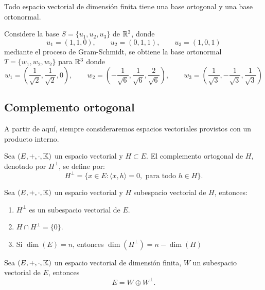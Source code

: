 \documentclass[a4,11pt]{aleph-notas}
\begin{document}
\begin{teo}
    Todo espacio vectorial de dimensión finita tiene una base ortogonal y una base ortonormal.
\end{teo}


\begin{ejem}
    Considere la base $S = \{u_1, u_2, u_3\}$ de $\mathbb{R}^3$, donde 
    \[
        u_1 = (1,1,0), \qquad u_2 = (0, 1,1), \qquad u_3 = (1,0,1)
    \]
    mediante el proceso de Gram-Schmidt, se obtiene la base ortonormal $T=\{w_1, w_2, w_2\}$ para $\mathbb{R}^3$ donde
    \[
        w_1 = \left(\dfrac{1}{\sqrt{2}},\dfrac{1}{\sqrt{2}},0\right), \qquad
        w_2 = \left(-\dfrac{1}{\sqrt{6}},\dfrac{1}{\sqrt{6}},
        \dfrac{2}{\sqrt{6}}\right), \qquad
        w_3 = \left(\dfrac{1}{\sqrt{3}},-\dfrac{1}{\sqrt{3}},
        \dfrac{1}{\sqrt{3}}\right)
    \]
\end{ejem}

\subsection{Complemento ortogonal}

A partir de aquí, siempre consideraremos espacios vectoriales provistos con un producto interno.

\begin{defi}
    Sea $(E,+,\cdot,\mathbb{K})$ un espacio vectorial y
    $H \subset E$. El complemento ortogonal de $H$, denotado por $H^\perp$, se define por:
    \[
        H^\perp = \{ x \in E: \langle x, h \rangle = 0, \text{ para todo } h \in H\}.
    \]
\end{defi}

\begin{teo}
    Sea $(E,+,\cdot,\mathbb{K})$ un espacio vectorial y
    $H$ subespacio vectorial de $H$, entonces:
    \begin{enumerate}
        \item $H^\perp$ es un subespacio vectorial de $E$.
        \item $H \cap H^\perp = \{0\}$.
        \item Si $\dim(E) = n$, entonces $\dim(H^\perp) = n - \dim(H)$
    \end{enumerate}
\end{teo}


\begin{teo}
    Sea $(E,+,\cdot,\mathbb{K})$ un espacio vectorial de dimensión finita, $W$ un subespacio vectorial de $E$, entonces 
    \[
    E = W \oplus W^\perp.
    \]
\end{teo}
\end{document}
